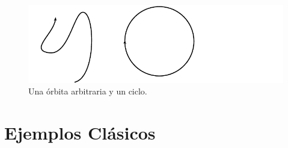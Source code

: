 \begin{figure}[!ht] \centering
	\includegraphics[scale=1.1]{figures/orbita-tipos.pdf}
	\caption{Una órbita arbitraria y un ciclo.}
\end{figure}

\section{Ejemplos Clásicos}

